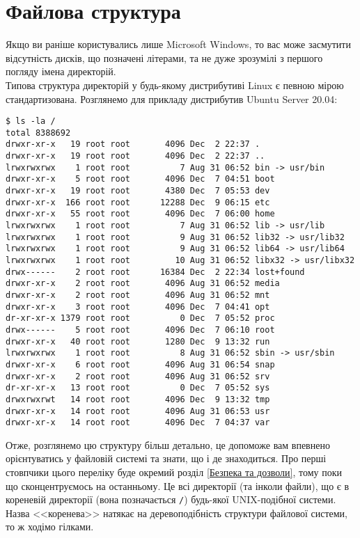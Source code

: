 \documentclass[10pt,a4paper]{fancyhandout}
\begin{document}
\section{Файлова структура}
Якщо ви раніше користувались лише Microsoft Windows, то вас може засмутити відсутність дисків, що позначені літерами, та не дуже зрозумілі з першого погляду імена директорій. \\ 
Типова структура директорій у будь-якому дистрибутиві Linux є певною мірою стандартизована. Розглянемо для прикладу дистрибутив Ubuntu Server 20.04:\\
\begin{verbatim}
$ ls -la /
total 8388692
drwxr-xr-x   19 root root       4096 Dec  2 22:37 .
drwxr-xr-x   19 root root       4096 Dec  2 22:37 ..
lrwxrwxrwx    1 root root          7 Aug 31 06:52 bin -> usr/bin
drwxr-xr-x    5 root root       4096 Dec  7 04:51 boot
drwxr-xr-x   19 root root       4380 Dec  7 05:53 dev
drwxr-xr-x  166 root root      12288 Dec  9 06:15 etc
drwxr-xr-x   55 root root       4096 Dec  7 06:00 home
lrwxrwxrwx    1 root root          7 Aug 31 06:52 lib -> usr/lib
lrwxrwxrwx    1 root root          9 Aug 31 06:52 lib32 -> usr/lib32
lrwxrwxrwx    1 root root          9 Aug 31 06:52 lib64 -> usr/lib64
lrwxrwxrwx    1 root root         10 Aug 31 06:52 libx32 -> usr/libx32
drwx------    2 root root      16384 Dec  2 22:34 lost+found
drwxr-xr-x    2 root root       4096 Aug 31 06:52 media
drwxr-xr-x    2 root root       4096 Aug 31 06:52 mnt
drwxr-xr-x    3 root root       4096 Dec  7 04:41 opt
dr-xr-xr-x 1379 root root          0 Dec  7 05:52 proc
drwx------    5 root root       4096 Dec  7 06:10 root
drwxr-xr-x   40 root root       1280 Dec  9 13:32 run
lrwxrwxrwx    1 root root          8 Aug 31 06:52 sbin -> usr/sbin
drwxr-xr-x    6 root root       4096 Aug 31 06:54 snap
drwxr-xr-x    2 root root       4096 Aug 31 06:52 srv
dr-xr-xr-x   13 root root          0 Dec  7 05:52 sys
drwxrwxrwt   14 root root       4096 Dec  9 13:32 tmp
drwxr-xr-x   14 root root       4096 Aug 31 06:53 usr
drwxr-xr-x   14 root root       4096 Dec  7 04:37 var
\end{verbatim}
Отже, розглянемо цю структуру більш детально, це допоможе вам впевнено орієнтуватись у файловій системі та знати, що і де знаходиться. Про перші стовпчики цього переліку буде окремий розділ \ref{Безпека та дозволи}, тому поки що сконцентруємось на останньому. Це всі директорії (та інколи файли), що є в кореневій директорії (вона позначається \texttt{/}) будь-якої UNIX-подібної системи. Назва <<коренева>> натякає на деревоподібність структури файлової системи, то ж ходімо гілками.
\end{document}
